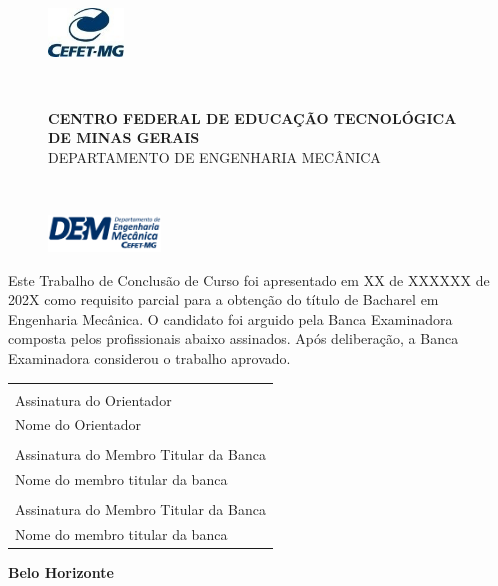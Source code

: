 \thispagestyle{empty}
\begin{figure}
    \centering
    \hspace{-2.5cm}\begin{minipage}{.1\textwidth}
        \includegraphics[width=2cm]{img/cefet.jpg}
        \end{minipage}\
    \hspace{0.75cm}
	\begin{minipage}{.8\textwidth}
	    \centering \large \textbf{\footnotesize{CENTRO FEDERAL DE EDUCAÇÃO TECNOLÓGICA DE MINAS GERAIS}}\\ \large{DEPARTAMENTO DE ENGENHARIA MECÂNICA}
        \end{minipage}\
    \hspace{0.45cm}
    \begin{minipage}{0.1\textwidth}
        \includegraphics[width=3cm]{img/dem.png}
        \end{minipage}
\end{figure}

\vspace{2em}


\begin{justify}
Este Trabalho de Conclusão de Curso foi apresentado em XX de XXXXXX de 202X como requisito parcial para a obtenção do título de Bacharel em Engenharia Mecânica. O candidato foi arguido pela Banca Examinadora composta pelos profissionais abaixo assinados. Após deliberação, a Banca Examinadora considerou o trabalho aprovado.
\end{justify}
\begin{center}
    \vspace{3em}
    
    \begin{tabular}{@{}p{80mm}@{}}
        \hrulefill \\
        \centering Assinatura do Orientador \\
        \centering Nome do Orientador \\
        \vspace{2em}
        
        \hrulefill \\
        \centering Assinatura do Membro Titular da Banca \\
        \centering Nome do membro titular da banca \\
        \vspace{2em}
        
        \hrulefill \\
        \centering Assinatura do Membro Titular da Banca\\
        \centering Nome do membro titular da banca
    \end{tabular}

    \vfill
    \textbf{\large \the\year{} Belo Horizonte}
\end{center}
\clearpage
